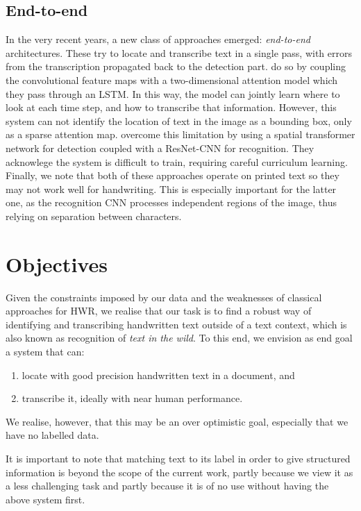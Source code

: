 
	\subsection{End-to-end}\label{sec:related_e2e}
		In the very recent years, a new class of approaches emerged: \emph{end-to-end} architectures. These try to locate and transcribe text in a single pass, with errors from the transcription propagated back to the detection part.  do so by coupling the convolutional feature maps with a two-dimensional attention model which they pass through an LSTM. In this way, the model can jointly learn where to look at each time step, and how to transcribe that information. However, this system can not identify the location of text in the image as a bounding box, only as a sparse attention map.  overcome this limitation by using a spatial transformer network \citep{stn} for detection coupled with a ResNet-CNN for recognition. They acknowlege the system is difficult to train, requiring careful curriculum learning. Finally, we note that both of these approaches operate on printed text so they may not work well for handwriting. This is especially important for the latter one, as the recognition CNN processes independent regions of the image, thus relying on separation between characters.





\section{Objectives}

	Given the constraints imposed by our data and the weaknesses of classical approaches for HWR, we realise that our task is to find a robust way of identifying and transcribing handwritten text outside of a text context, which is also known as recognition of \emph{text in the wild}. To this end, we envision as end goal a system that can:
	\begin{enumerate}
	 	\item locate with good precision handwritten text in a document, and
	 	\item transcribe it, ideally with near human performance.
	\end{enumerate}
	We realise, however, that this may be an over optimistic goal, especially that we have no labelled data.

	It is important to note that matching text to its label in order to give structured information is beyond the scope of the current work, partly because we view it as a less challenging task and partly because it is of no use without having the above system first.




